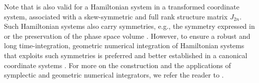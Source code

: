 Note that  is also valid for a Hamiltonian system in a transformed coordinate system, associated with a skew-symmetric and full rank structure matrix $J_{2n}$. Such Hamiltonian systems also carry symmetries, e.g., the symmetry expressed in  or the preservation of the phase space volume \cite{Hairer:1250576}. However, to ensure a robust and long time-integration, geometric numerical integration of Hamiltonian systems that exploits such symmetries is preferred and better established in a canonical coordinate systems \cite{Hairer:1250576,bhatt2017structure}.  For more on the construction and the applications of symplectic and geometric numerical integrators, we refer the reader to \cite{Hairer:1250576,bhatt2017structure}.
